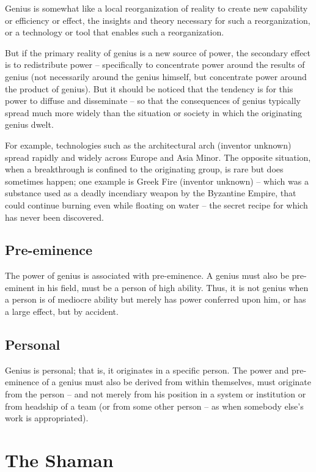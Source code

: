 \documentclass[
]{book}
\begin{document}
Genius is somewhat like a local reorganization of reality to create new capability or efficiency or effect, the insights and theory necessary for such a reorganization, or a technology or tool that enables such a reorganization.

But if the primary reality of genius is a new source of power, the secondary effect is to redistribute power -- specifically to concentrate power around the results of genius (not necessarily around the genius himself, but concentrate power around the product of genius). But it should be noticed that the tendency is for this power to diffuse and disseminate -- so that the consequences of genius typically spread much more widely than the situation or society in which the originating genius dwelt.

For example, technologies such as the architectural arch (inventor unknown) spread rapidly and widely across Europe and Asia Minor. The opposite situation, when a breakthrough is confined to the originating group, is rare but does sometimes happen; one example is Greek Fire (inventor unknown) -- which was a substance used as a deadly incendiary weapon by the Byzantine Empire, that could continue burning even while floating on water -- the secret recipe for which has never been discovered.

\hypertarget{pre-eminence}{%
\subsection{Pre-eminence}\label{pre-eminence}}

The power of genius is associated with pre-eminence. A genius must also be pre-eminent in his field, must be a person of high ability. Thus, it is not genius when a person is of mediocre ability but merely has power conferred upon him, or has a large effect, but by accident.

\hypertarget{personal}{%
\subsection{Personal}\label{personal}}

Genius is personal; that is, it originates in a specific person. The power and pre-eminence of a genius must also be derived from within themselves, must originate from the person -- and not merely from his position in a system or institution or from headship of a team (or from some other person -- as when somebody else's work is appropriated).

\hypertarget{the-shaman}{%
\section{The Shaman}\label{the-shaman}}
\end{document}
